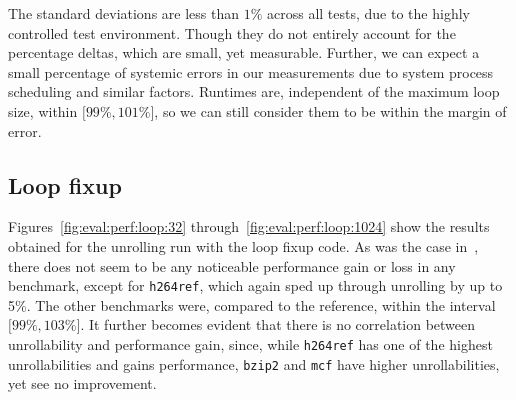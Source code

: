 The standard deviations are less than $1\%$ across all tests, due to the highly controlled test environment.
Though they do not entirely account for the percentage deltas, which are small, yet measurable.
Further, we can expect a small percentage of systemic errors in our measurements due to system process scheduling and similar factors.
Runtimes are, independent of the maximum loop size, within $\lbrack 99\%, 101\% \rbrack$, so we can still consider them to be within the margin of error.

\subsection{Loop fixup}\label{sec:eval:perf:loop}

Figures~\ref{fig:eval:perf:loop:32} through~\ref{fig:eval:perf:loop:1024} show the results obtained for the unrolling run with the loop fixup code.
As was the case in~, there does not seem to be any noticeable performance gain or loss in any benchmark, except for \texttt{h264ref}, which again sped up through unrolling by up to 5\%.
The other benchmarks were, compared to the reference, within the interval $\lbrack 99\%, 103\% \rbrack$.
It further becomes evident that there is no correlation between unrollability and performance gain, since, while \texttt{h264ref} has one of the highest unrollabilities and gains performance, \texttt{bzip2} and \texttt{mcf} have higher unrollabilities, yet see no improvement.





